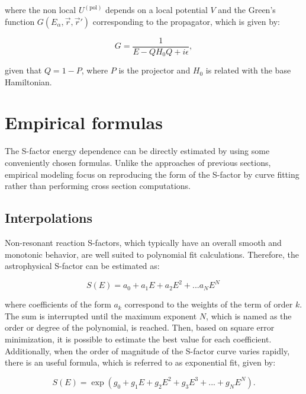 \documentclass[openany]{book}
\begin{document}
where the non local $U^{(\mathrm{pol})} $  depends on a local potential $V$ and the Green's function $G(E_\alpha, \vec r, \vec r')$ corresponding to the propagator, which is given by:

\begin{equation}\label{eq:potential_propagator}
	G = \frac{1}{E - QH_0Q + i\epsilon},
\end{equation}

given that $Q = 1 - P$, where $P$ is the projector and $H_0$ is related with the base Hamiltonian. \\

\section{Empirical formulas} \label{sec:empiricalFormulas}

The S-factor energy dependence can be directly estimated by using some conveniently chosen formulas. Unlike the approaches of previous sections, empirical modeling focus on reproducing the form of the S-factor by curve fitting rather than performing cross section computations.

\subsection{Interpolations} \label{sub:empirical_interpolation}

Non-resonant reaction S-factors, which typically have an overall smooth and monotonic behavior, are well suited to polynomial fit calculations. Therefore, the astrophysical S-factor can be estimated as:

\begin{equation}  \label{eq:empirical_polynomial}
	S(E) = a_0 + a_1E + a_2 E^2 + ... a_NE^N \, 
\end{equation}

where coefficients of the form $a_k$ correspond to the weights of the term of order $k$. The sum is interrupted until the maximum exponent $N$, which is named as the order or degree of the polynomial, is reached. Then, based on square error minimization, it is possible to estimate the best value for each coefficient. Additionally, when the order of magnitude of the S-factor curve varies rapidly, there is an useful formula, which is referred to as exponential fit, given by:

\begin{equation} \label{eq:empirical_exponential}
	S(E) = \exp{(g_0 + g_1E + g_2E^2 + g_3E^3 + ... + g_NE^N)}.
\end{equation}
\end{document}
